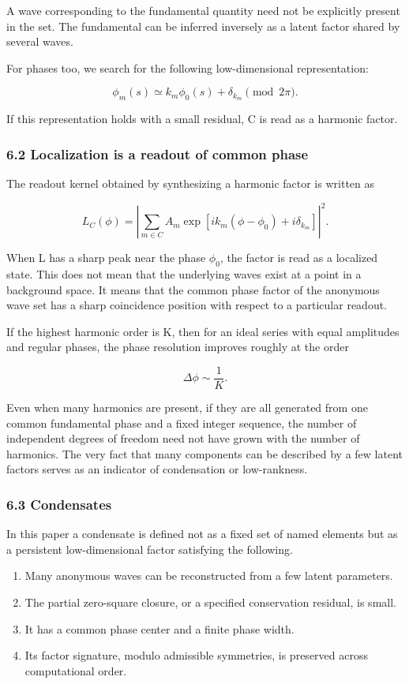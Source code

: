 \documentclass[
  a4paper,
]{article}
\providecommand{\tightlist}{%
  \setlength{\itemsep}{0pt}\setlength{\parskip}{0pt}}
\begin{document}
A wave corresponding to the fundamental quantity need not be explicitly
present in the set. The fundamental can be inferred inversely as a
latent factor shared by several waves.

For phases too, we search for the following low-dimensional
representation:

\[
\phi_m(s)
\simeq
k_m\phi_0(s)+\delta_{k_m}
\pmod{2\pi}.
\]

If this representation holds with a small residual, C is read as a
harmonic factor.

\subsubsection{6.2 Localization is a readout of common
phase}\label{localization-is-a-readout-of-common-phase}

The readout kernel obtained by synthesizing a harmonic factor is written
as

\[
L_C(\phi)
=
\left|
\sum_{m\in C}
A_m
\exp\left[
i k_m(\phi-\phi_0)
+i\delta_{k_m}
\right]
\right|^2.
\]

When L has a sharp peak near the phase \(\phi_0\), the factor is read as
a localized state. This does not mean that the underlying waves exist at
a point in a background space. It means that the common phase factor of
the anonymous wave set has a sharp coincidence position with respect to
a particular readout.

If the highest harmonic order is K, then for an ideal series with equal
amplitudes and regular phases, the phase resolution improves roughly at
the order

\[
\Delta\phi
\sim
\frac{1}{K}.
\]

Even when many harmonics are present, if they are all generated from one
common fundamental phase and a fixed integer sequence, the number of
independent degrees of freedom need not have grown with the number of
harmonics. The very fact that many components can be described by a few
latent factors serves as an indicator of condensation or low-rankness.

\subsubsection{6.3 Condensates}\label{condensates}

In this paper a condensate is defined not as a fixed set of named
elements but as a persistent low-dimensional factor satisfying the
following.

\begin{enumerate}
\def\labelenumi{\arabic{enumi}.}
\tightlist
\item
  Many anonymous waves can be reconstructed from a few latent
  parameters.
\item
  The partial zero-square closure, or a specified conservation residual,
  is small.
\item
  It has a common phase center and a finite phase width.
\item
  Its factor signature, modulo admissible symmetries, is preserved
  across computational order.
\end{enumerate}
\end{document}
